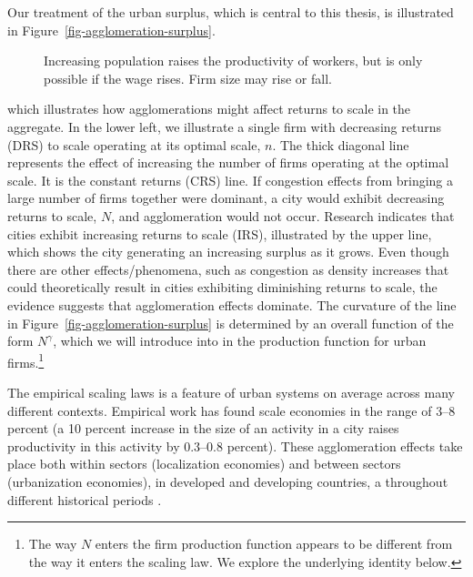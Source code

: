 Our treatment of the urban surplus, which is central to this thesis, is illustrated in Figure~\ref{fig-agglomeration-surplus}. 
\begin{figure}[htb]
    \centering

    \caption[Increasing population raises the productivity of workers]{Increasing population raises the productivity of workers, but is only possible if the wage rises. Firm size may rise or fall.}
    \label{fig-wage-workforce-effects} %
\end{figure}
which illustrates how agglomerations might affect returns to scale in the aggregate.
In the lower left, we illustrate a single firm with decreasing returns (DRS) to scale operating at its optimal scale, $n$. The thick diagonal line represents the effect of increasing the number of firms operating at the optimal scale. It is the constant returns (CRS) line. If congestion effects from bringing a large number of firms together were dominant, a city would exhibit decreasing returns to scale,  $N$, and agglomeration would not occur. Research indicates that cities exhibit increasing returns to scale (IRS), illustrated by the upper line, which shows the city generating an increasing surplus as it grows. Even though there are other effects/phenomena, such as congestion as density increases that could theoretically result in cities exhibiting diminishing returns to scale, the evidence suggests that agglomeration effects dominate. The curvature of the line in Figure~\ref{fig-agglomeration-surplus} is determined by an overall  function of the form $N^\gamma$, which we will introduce into in the production function for urban firms.\footnote{The way $N$ enters the firm production function appears to be different from the way it enters the scaling law. We explore the underlying identity below.} 

The empirical \glspl{scaling law} is a feature of urban systems on average across many different contexts.  Empirical work has found %
scale economies in the range of 3--8 percent (a 10 percent increase in the size of an activity in a city raises productivity in this activity by 0.3--0.8 percent). These agglomeration effects take place both within sectors (localization economies) and between sectors (urbanization economies),  in developed and developing countries, a throughout different historical periods \cite{bettencourtIntroductionUrbanScience2021}. %

